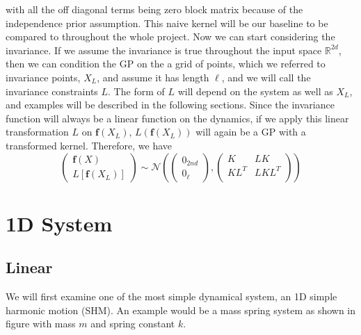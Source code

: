 \documentclass{statsmsc}
\begin{document}
with all the off diagonal terms being zero block matrix because of the independence prior assumption.
This naive kernel will be our baseline to be compared to throughout the whole project.
Now we can start considering the invariance. 
If we assume the invariance is true throughout the input space $\mathbb{R}^{2d}$, then we can condition the GP on the a grid of points, which we referred to invariance points, $X_L$, and assume it has length $\ell$, and we will call the invariance constraints $L$.
The form of $L$ will depend on the system as well as $X_L$, and examples will be described in the following sections.
Since the invariance function will always be a linear function on the dynamics, if we apply this linear transformation $L$ on $\mathbf{f}(X_L)$, $L(\mathbf{f}(X_L))$ will again be a GP with a transformed kernel.
Therefore, we have 
$$\begin{pmatrix}
\mathbf{f}(X)\\L[\mathbf{f}(X_L)]
\end{pmatrix}
\sim\mathcal{N}
\left(\begin{pmatrix}0_{2nd}\\0_{\ell}\end{pmatrix}, \begin{pmatrix}
    K & LK \\
    KL^T & LKL^T\\
\end{pmatrix}\right)
$$

\section{1D System}
\subsection{Linear}
We will first examine one of the most simple dynamical system, an 1D simple harmonic motion (SHM). 
An example would be a mass spring system as shown in figure with mass $m$ and spring constant $k$. 

\begin{figure}[H]
    \centering
{}
\end{figure}
\end{document}
